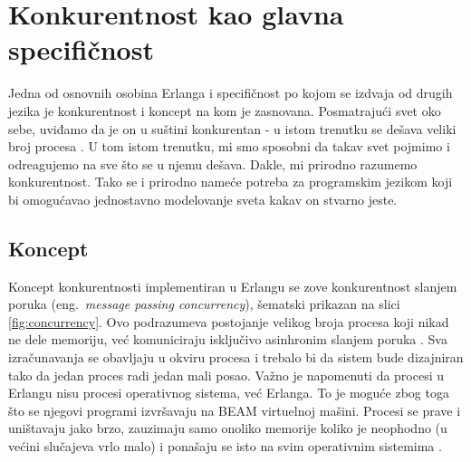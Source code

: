 \documentclass[a4paper]{article}
\begin{document}
{\section{Konkurentnost kao glavna specifičnost}
\label{sec:konkurentnost}
Jedna od osnovnih osobina Erlanga i specifičnost po kojom se izdvaja od drugih jezika je konkurentnost i koncept na kom je zasnovana.
Posmatrajući svet oko
sebe, uviđamo da je on u suštini konkurentan - u istom trenutku se dešava veliki broj procesa \cite{phdthesis}. 
U tom istom trenutku, mi smo sposobni da takav svet pojmimo i odreagujemo na sve što se u njemu dešava. Dakle, mi prirodno razumemo konkurentnost.
Tako se i prirodno nameće potreba za programskim jezikom koji bi omogućavao jednostavno modelovanje sveta kakav on stvarno jeste.

\subsection{Koncept}
Koncept konkurentnosti implementiran u Erlangu se zove konkurentnost slanjem poruka (eng.~{\em message passing concurrency}), šematski prikazan na slici \ref{fig:concurrency}. Ovo podrazumeva postojanje velikog broja procesa koji nikad ne dele memoriju, već komuniciraju isključivo asinhronim slanjem poruka \cite{book_joe}.
Sva izračunavanja se obavljaju u okviru procesa i trebalo bi da sistem bude dizajniran tako da jedan proces radi jedan mali posao.
Važno je napomenuti da procesi u Erlangu nisu procesi operativnog sistema, već Erlanga.
To je moguće zbog toga što se njegovi programi izvršavaju na BEAM virtuelnoj mašini.
Procesi se prave i uništavaju jako brzo, zauzimaju samo onoliko memorije koliko je neophodno (u većini slučajeva vrlo malo)
i ponašaju se isto na svim operativnim sistemima \cite{book_joe}.

}
\end{document}
